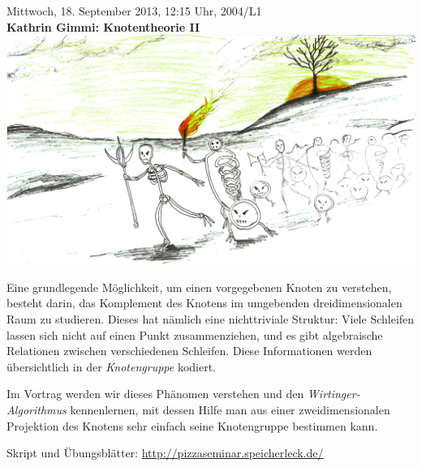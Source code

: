\documentclass[a4paper,ngerman,landscape]{scrartcl}
\begin{document}
\newpage

\begin{center}
  \huge
  Mittwoch, 18. September 2013, 12:15 Uhr, 2004/L1 \\
  \textbf{Kathrin Gimmi: Knotentheorie II}
  \vfill
  \includegraphics[scale=0.6]{knotenarmee-duester-farbkorrigiert}
  \vfill

  \Large
  \begin{minipage}{0.94\textwidth}
    \setlength\parskip{\medskipamount}
    Eine grundlegende Möglichkeit, um einen vorgegebenen Knoten zu verstehen,
    besteht darin, das Komplement des Knotens im umgebenden dreidimensionalen
    Raum zu studieren. Dieses hat nämlich eine nichttriviale
    Struktur: Viele Schleifen lassen sich nicht auf einen Punkt zusammenziehen,
    und es gibt algebraische Relationen zwischen verschiedenen Schleifen. Diese
    Informationen werden übersichtlich in der \emph{Knotengruppe} kodiert.
    
    Im Vortrag werden wir dieses Phänomen verstehen und
    den \emph{Wirtinger-Algorithmus} kennenlernen, mit dessen Hilfe man aus einer
    zweidimensionalen Projektion des Knotens sehr einfach seine Knotengruppe
    bestimmen kann.
  \end{minipage}
\end{center}

\hfill\small Skript und Übungsblätter: \url{http://pizzaseminar.speicherleck.de/}
\end{document}
